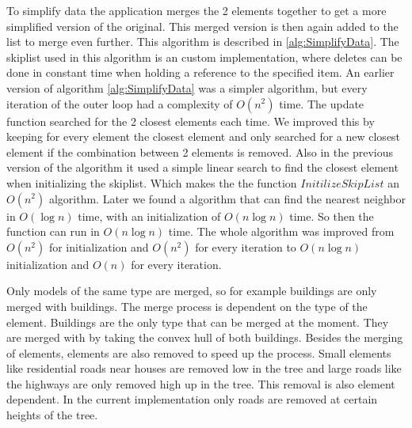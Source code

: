 To simplify data the application merges the 2 elements together to get a more simplified version of the original. This merged version is then again added to the list to merge even further. This algorithm is described in \ref{alg:SimplifyData}. The skiplist used in this algorithm is an custom implementation, where deletes can be done in constant time when holding a reference to the specified item. An earlier version of algorithm \ref{alg:SimplifyData} was a simpler algorithm, but every iteration of the outer loop had a complexity of $O(n^2)$ time. The update function searched for the 2 closest elements each time. We improved this by keeping for every element the closest element and only searched for a new closest element if the combination between 2 elements is removed. Also in the previous version of the algorithm it used a simple linear search to find the closest element when initializing the skiplist. Which makes the the function $InitilizeSkipList$ an $O(n^2)$ algorithm. Later we found a algorithm that can find the nearest neighbor in $O(\log{n})$ time, with an initialization of $O(n\log{n})$ time. So then the function can run in $O(n\log{n})$ time. The whole algorithm was improved from $O(n^2)$  for initialization and $O(n^2)$ for every iteration to $O(n\log{n})$ initialization and $O(n)$ for every iteration.

Only models of the same type are merged, so for example buildings are only merged with buildings. The merge process is dependent on the type of the element. Buildings are the only type that can be merged at the moment. They are merged with by taking the convex hull of both buildings. Besides the merging of elements, elements are also removed to speed up the process. Small elements like residential roads near houses are removed low in the tree and large roads like the highways are only removed high up in the tree. This removal is also element dependent. In the current implementation only roads are removed at certain heights of the tree.

